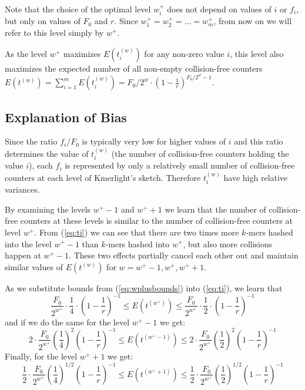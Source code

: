 \medskip

Note that the choice of the optimal level $w_i^+$ does not depend on values of $i$ or $f_i$,
but only on values of $F_0$ and $r$. Since $w_1^+ = w_2^+ = \dots = w_m^+$, from now on 
we will refer to this level simply by $w^+$.

As the level $w^+$ maximizes $E(t_i^{(w)})$ for any non-zero value $i$, 
this level also maximizes the expected number of all non-empty collision-free counters
$E(t^{(w)}) = \sum_{i=1}^m E(t_i^{(w)}) = F_0 / 2^w \cdot
\left(1 - \frac{1}{r}\right)^{F_0/2^w - 1} $.


\subsection{Explanation of Bias}
Since the ratio $f_i / F_0$ is typically very low for higher values of $i$ and this
ratio determines the value of $t_i^{(w)}$ (the number of collision-free counters holding
the value $i$), each $f_i$ is represented by only a relatively small number of collision-free
counters at each level of Kmerlight's sketch. Therefore $t_i^{(w)}$ have high relative variances. 


By examining the levels $w^+-1$ and $w^++1$ we learn that the number of collision-free
counters at these levels is similar to the number of collision-free counters at level $w^+$. 
From (\ref{eq:ti}) we can see that there are two times more $k$-mers hashed into the level $w^+-1$
than $k$-mers hashed into $w^+$, but also more collisions happen at $w^+-1$. These
two effects partially cancel each other out and maintain similar values of $E(t^{(w)})$
for $w = w^+-1, w^+, w^++1$.

As we substitute bounds from (\ref{eq:wplusbounds}) into (\ref{eq:ti}), we learn that
$$ 
\frac{F_0}{2^{w^+}} \cdot \frac{1}{4} \cdot \left(1 - \frac{1}{r}\right)^{-1}
\leq E(t^{(w^+)}) \leq 
\frac{F_0}{2^{w^+}} \cdot \frac{1}{2} \cdot \left(1 - \frac{1}{r}\right)^{-1}
$$
and if we do the same for the level $w^+-1$ we get:
$$ 
2 \cdot \frac{F_0}{2^{w^+}} \left(\frac{1}{4}\right)^2 \left(1 - \frac{1}{r}\right)^{-1}
\leq E(t^{(w^+-1)}) \leq 
2 \cdot \frac{F_0}{2^{w^+}} \left(\frac{1}{2}\right)^2 \left(1 - \frac{1}{r}\right)^{-1}
$$
Finally, for the level $w^++1$ we get:
$$ 
\frac{1}{2} \cdot \frac{F_0}{2^{w^+}} \left(\frac{1}{4}\right)^{1/2} \left(1 - \frac{1}{r}\right)^{-1}
\leq E(t^{(w^++1)}) \leq 
\frac{1}{2} \cdot \frac{F_0}{2^{w^+}} \left(\frac{1}{2}\right)^{1/2} \left(1 - \frac{1}{r}\right)^{-1}
$$


